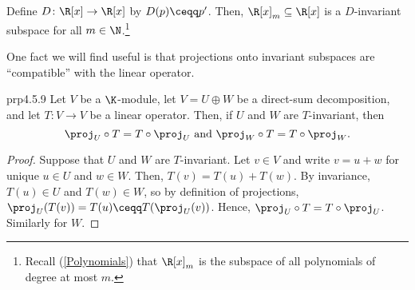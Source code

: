 \begin{exm}{}{}
	Define $D\colon \R [x]\rightarrow \R [x]$ by $D(p)\ceqq p'$.  Then, $\R [x]_m\subseteq \R [x]$ is a $D$-invariant subspace for all $m\in \N$.\footnote{Recall (\cref{Polynomials}) that $\R [x]_m$ is the subspace of all polynomials of degree at most $m$.}
\end{exm}

One fact we will find useful is that projections onto invariant subspaces are ``compatible'' with the linear operator.
\begin{prp}{}{prp4.5.9}
	Let $V$ be a $\K$-module, let $V=U\oplus W$ be a direct-sum decomposition, and let $T\colon V\rightarrow V$ be a linear operator.  Then, if $U$ and $W$ are $T$-invariant, then
	\begin{equation}
		\proj _U\circ T=T\circ \proj _U\text{ and }\proj _W\circ T=T\circ \proj _W.
	\end{equation}
	\begin{proof}
		Suppose that $U$ and $W$ are $T$-invariant.  Let $v\in V$ and write $v=u+w$ for unique $u\in U$ and $w\in W$.  Then, $T(v)=T(u)+T(w)$.  By invariance, $T(u)\in U$ and $T(w)\in W$, so by definition of projections, $\proj _U(T(v))=T(u)\ceqq T(\proj _U(v))$.  Hence, $\proj _U\circ T=T\circ \proj _U$.  Similarly for $W$.
	\end{proof}
\end{prp}

